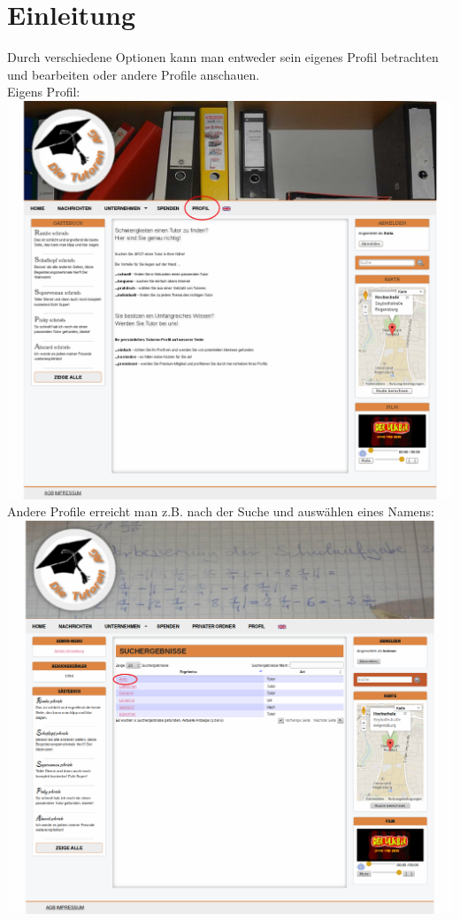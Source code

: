 
\section{Einleitung}
Durch verschiedene Optionen kann man entweder sein eigenes Profil betrachten und bearbeiten oder andere Profile anschauen.\\
Eigens Profil:\\
\includegraphics[width=1\textwidth]{../Screenshots/de/Startseite_profile_change}
\newpage
Andere Profile erreicht man z.B. nach der Suche und auswählen eines Namens:\\
\includegraphics[width=1\textwidth]{../Screenshots/de/Suchergebnisse-profile-doku}